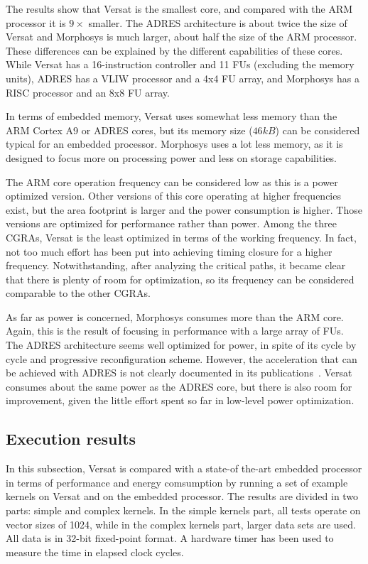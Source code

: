 \documentclass[journal]{IEEEtran}
\begin{document}
The results show that Versat is the smallest core, and compared with
the ARM processor it is $9\times$ smaller. The ADRES architecture is
about twice the size of Versat and Morphosys is much larger, about
half the size of the ARM processor. These differences can be explained
by the different capabilities of these cores. While Versat has a
16-instruction controller and 11 FUs (excluding the memory units),
ADRES has a VLIW processor and a 4x4 FU array, and Morphosys has a
RISC processor and an 8x8 FU array.

In terms of embedded memory, Versat uses somewhat less memory than the
ARM Cortex A9 or ADRES cores, but its memory size ($46kB$) can be
considered typical for an embedded processor. Morphosys uses a lot
less memory, as it is designed to focus more on processing power and
less on storage capabilities.

The ARM core operation frequency can be considered low as this is a
power optimized version. Other versions of this core operating at
higher frequencies exist, but the area footprint is larger and the
power consumption is higher. Those versions are optimized for
performance rather than power. Among the three CGRAs, Versat is the
least optimized in terms of the working frequency. In fact, not too
much effort has been put into achieving timing closure for a higher
frequency. Notwithstanding, after analyzing the critical paths, it
became clear that there is plenty of room for optimization, so its
frequency can be considered comparable to the other CGRAs.

As far as power is concerned, Morphosys consumes more than the ARM
core. Again, this is the result of focusing in performance with a
large array of FUs. The ADRES architecture seems well optimized for
power, in spite of its cycle by cycle and progressive reconfiguration
scheme. However, the acceleration that can be achieved with ADRES is
not clearly documented in its publications~\cite{Mei05}. Versat
consumes about the same power as the ADRES core, but there is also
room for improvement, given the little effort spent so far in
low-level power optimization.

\subsection{Execution results}
\label{section:executionResults}

In this subsection, Versat is compared with a state-of the-art
embedded processor in terms of performance and energy comsumption by
running a set of example kernels on Versat and on the embedded
processor. The results are divided in two parts: simple and complex
kernels. In the simple kernels part, all tests operate on vector sizes
of 1024, while in the complex kernels part, larger data sets are
used. All data is in 32-bit fixed-point format. A hardware timer has
been used to measure the time in elapsed clock cycles.
\end{document}
